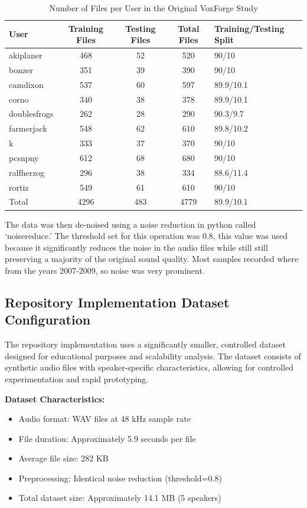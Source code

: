 \documentclass[11pt,twoside,openany]{book}
\begin{document}
\begin{table}
    \centering
    \begin{tabular}{|l|c|c|c|l|}
        \hline
        \textbf{User} & \textbf{Training Files} & \textbf{Testing Files} & \textbf{Total Files}  & \textbf{Training/Testing Split}\\ \hline
         akiplaner  & 468& 52& 520 &90/10\\ \hline
         bonzer & 351& 39& 390 &90/10\\ \hline
 camdixon& 537& 60&597 &89.9/10.1\\\hline
 corno& 340& 38&378 &89.9/10.1\\\hline
 doublesfrogs& 262& 28&290 &90.3/9.7\\\hline
 farmerjack& 548& 62&610 &89.8/10.2\\\hline
 k& 333& 37&370 &90/10\\\hline
 pcsnpny& 612& 68&680 &90/10\\\hline
 ralfherzog& 296& 38&334 &88.6/11.4\\\hline
 rortiz& 549& 61&610 &90/10\\\hline
 Total& 4296& 483&4779 &89.9/10.1\\\hline
    \end{tabular}
    \caption{Number of Files per User in the Original VoxForge Study}
    \label{tab:user_file_counts}
    \end{table}
The data was then de-noised using a noise reduction in python called `noisereduce.' The threshold set for this operation was 0.8, this value was used because it significantly reduces the noise in the audio files while still still preserving a majority of the original sound quality. Most samples recorded where from the years 2007-2009, so noise was very prominent.

\subsection{Repository Implementation Dataset Configuration}
The repository implementation uses a significantly smaller, controlled dataset designed for educational purposes and scalability analysis. The dataset consists of synthetic audio files with speaker-specific characteristics, allowing for controlled experimentation and rapid prototyping.

\textbf{Dataset Characteristics:}
\begin{itemize}[itemsep=1pt]
\item Audio format: WAV files at 48 kHz sample rate
\item File duration: Approximately 5.9 seconds per file
\item Average file size: 282 KB
\item Preprocessing: Identical noise reduction (threshold=0.8)
\item Total dataset size: Approximately 14.1 MB (5 speakers)
\end{itemize}
\end{document}
